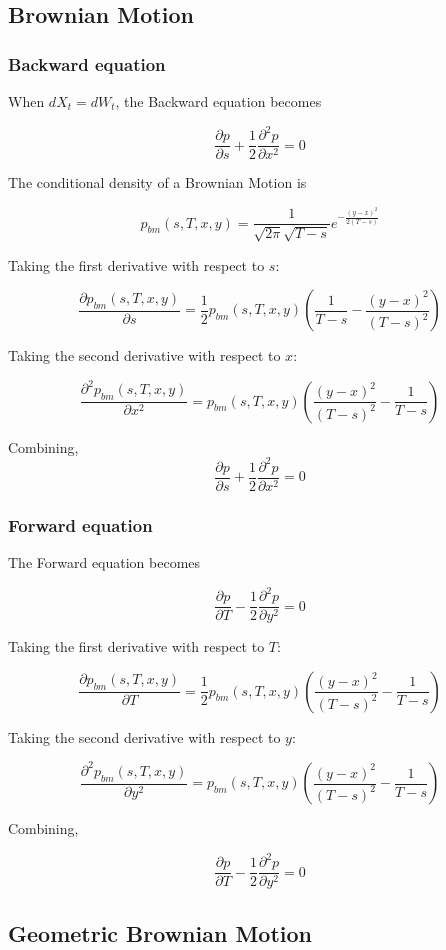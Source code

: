 \documentclass{article}
\theoremstyle{definition}
\begin{document}
\subsection{Brownian Motion}
\subsubsection{Backward equation}
When \(dX_t=dW_t\), the Backward equation becomes

\[\frac{\partial p} {\partial s} + \frac{1}{2} \frac{\partial^2 p}{\partial x^2} =0\]

The conditional density of a Brownian Motion is

\[p_{bm}(s, T, x, y)=\frac{1}{\sqrt{2\pi} \sqrt{T-s}} e^{-\frac{(y-x)^2}{2(T-s)}} \]

Taking the first derivative with respect to \(s\):

\[\frac{\partial p_{bm}(s, T, x, y)}{\partial s}=  \frac{1}{2}p_{bm}(s, T, x, y)\left(\frac{1}{T-s}-\frac{(y-x)^2}{(T-s)^2}\right)  \]

Taking the second derivative with respect to \(x\):

\[\frac{\partial^2 p_{bm}(s, T, x, y)}{\partial x^2}=  p_{bm}(s, T, x, y)\left(\frac{(y-x)^2}{(T-s)^2}-\frac{1}{T-s}\right)  \]

Combining,
\[\frac{\partial p} {\partial s} + \frac{1}{2} \frac{\partial^2 p}{\partial x^2} =0\]
\subsubsection{Forward equation}
The Forward equation becomes

\[\frac{\partial p} {\partial T} -\frac{1}{2} \frac{\partial^2 p}{\partial y^2} =0\]

Taking the first derivative with respect to \(T\):

\[\frac{\partial p_{bm}(s, T, x, y)}{\partial T}=  \frac{1}{2}p_{bm}(s, T, x, y)\left(\frac{(y-x)^2}{(T-s)^2}-\frac{1}{T-s}\right)  \]

Taking the second derivative with respect to \(y\):

\[\frac{\partial^2 p_{bm}(s, T, x, y)}{\partial y^2}=  p_{bm}(s, T, x, y)\left(\frac{(y-x)^2}{(T-s)^2}-\frac{1}{T-s}\right)  \]

Combining, 

\[\frac{\partial p} {\partial T} -\frac{1}{2} \frac{\partial^2 p}{\partial y^2} =0\]

\subsection{Geometric Brownian Motion}
\end{document}
